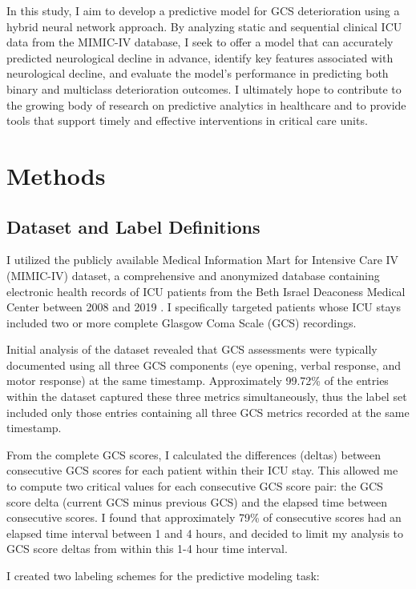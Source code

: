 \documentclass[conference]{IEEEtran}
\begin{document}
In this study, I aim to develop a predictive model for GCS deterioration using a hybrid neural network approach. By analyzing static and sequential clinical ICU data from the MIMIC-IV database, I seek to offer a model that can accurately predicted neurological decline in advance, identify key features associated with neurological decline, and evaluate the model's performance in predicting both binary and multiclass deterioration outcomes. I ultimately hope to contribute to the growing body of research on predictive analytics in healthcare and to provide tools that support timely and effective interventions in critical care units.

\section{Methods}

\subsection{Dataset and Label Definitions}

I utilized the publicly available Medical Information Mart for Intensive Care IV (MIMIC-IV) dataset, a comprehensive and anonymized database containing electronic health records of ICU patients from the Beth Israel Deaconess Medical Center between 2008 and 2019 \cite{johnson2020mimic}. I specifically targeted patients whose ICU stays included two or more complete Glasgow Coma Scale (GCS) recordings.

Initial analysis of the dataset revealed that GCS assessments were typically documented using all three GCS components (eye opening, verbal response, and motor response) at the same timestamp. Approximately 99.72\% of the entries within the dataset captured these three metrics simultaneously, thus the label set included only those entries containing all three GCS metrics recorded at the same timestamp.

From the complete GCS scores, I calculated the differences (deltas) between consecutive GCS scores for each patient within their ICU stay. This allowed me to compute two critical values for each consecutive GCS score pair: the GCS score delta (current GCS minus previous GCS) and the elapsed time between consecutive scores. I found that approximately 79\% of consecutive scores had an elapsed time interval between 1 and 4 hours, and decided to limit my analysis to GCS score deltas from within this 1-4 hour time interval.

I created two labeling schemes for the predictive modeling task:
\end{document}
